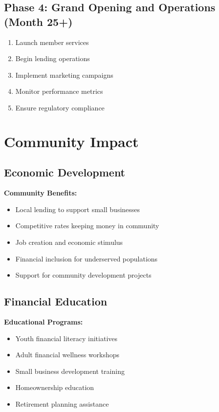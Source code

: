 \documentclass[11pt,letterpaper]{article}
\begin{document}
\subsection{Phase 4: Grand Opening and Operations (Month 25+)}
\begin{enumerate}[leftmargin=*]
    \item Launch member services
    \item Begin lending operations
    \item Implement marketing campaigns
    \item Monitor performance metrics
    \item Ensure regulatory compliance
\end{enumerate}

\section{Community Impact}

\subsection{Economic Development}
\textbf{Community Benefits:}
\begin{itemize}[leftmargin=*]
    \item Local lending to support small businesses
    \item Competitive rates keeping money in community
    \item Job creation and economic stimulus
    \item Financial inclusion for underserved populations
    \item Support for community development projects
\end{itemize}

\subsection{Financial Education}
\textbf{Educational Programs:}
\begin{itemize}[leftmargin=*]
    \item Youth financial literacy initiatives
    \item Adult financial wellness workshops
    \item Small business development training
    \item Homeownership education
    \item Retirement planning assistance
\end{itemize}
\end{document}
